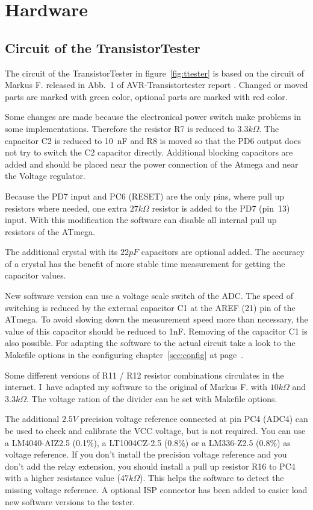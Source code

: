 \chapter{Hardware}

\section{Circuit of the TransistorTester}
\label{sec:hardware}
The circuit of the TransistorTester in figure~\ref{fig:ttester} is based on the circuit of
 Markus F. released in Abb.~1 of AVR-Transistortester report \cite{Frejek}.
Changed or moved parts are marked with green color, optional parts are marked with red color.

Some changes are made because the electronical power switch make problems in some implementations.
Therefore the resistor R7 is reduced to \(3.3k\Omega\). The capacitor C2 is reduced to
10~nF and R8 is moved so that the PD6 output does not try to switch the C2 capacitor directly.
 Additional blocking capacitors are added and should be placed
near the power connection of the Atmega and near the Voltage regulator.

Because the PD7 input and PC6 (RESET) are the only pins, where pull up resistors where
needed, one extra \(27k\Omega\) resistor is added to the PD7 (pin~13) input. With this modification
the software can disable all internal pull up resistors of the ATmega.

The additional crystal with its \(22pF\) capacitors are optional added. 
The accuracy of a crystal has the benefit of more stable time measurement for getting the
capacitor values.

New software version can use a voltage scale switch of the ADC. The speed of switching is reduced
by the external capacitor C1 at the AREF (21) pin of the ATmega. To avoid slowing down the
measurement speed more than necessary, the value of this capacitor should be reduced to 1nF.
Removing of the capacitor C1 is also possible.
For adapting the software to the actual circuit take a look to the Makefile options in the
configuring chapter~\ref{sec:config} at page~\pageref{sec:config}.

Some different versions of R11 / R12 resistor combinations circulates
in the internet. I~have adapted my software to the original of Markus F. \cite{Frejek} with \(10k\Omega\) and \(3.3k\Omega\).
The voltage ration of the divider can be set with Makefile options.

The additional \(2.5V\) precision voltage reference connected at pin PC4 (ADC4) can be used to
check and calibrate the VCC voltage, but is not required. You can use a LM4040-AIZ2.5 (0.1\%),
a LT1004CZ-2.5 (0.8\%) or a LM336-Z2.5 (0.8\%) as voltage reference.
If you don't install the precision voltage reference and you don't add the relay extension,
you should install a pull up resistor R16 to PC4 with a higher resistance value (\(47k\Omega\)).
This helps the software to detect the missing voltage reference.
A optional ISP connector has been added to easier load new software versions to the tester.

